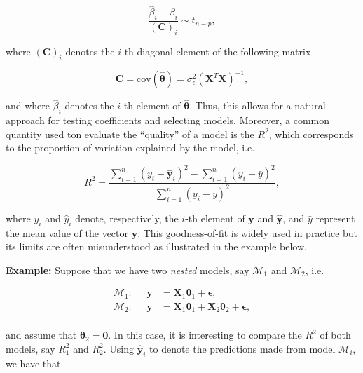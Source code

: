\documentclass[]{book}
\theoremstyle{definition}
\theoremstyle{definition}
\theoremstyle{definition}
\theoremstyle{remark}
\begin{document}
{\begin{equation}
    \frac{\hat{\beta}_i - \beta_i}{\left(\boldsymbol{C}\right)_{i}} \sim t_{n-p},
    \label{eq:beta_t_dist}
\end{equation}

where \(\left(\boldsymbol{C}\right)_{i}\) denotes the \(i\)-th diagonal
element of the following matrix

\begin{equation}
        \boldsymbol{C} = \text{cov} \left(\hat{\boldsymbol{\theta}} \right) = \sigma_{\epsilon}^2 \left(\mathbf{X}^T \mathbf{X}\right)^{-1},
    \label{eq:covbeta}
\end{equation}

and where \(\hat{\beta}_i\) denotes the \(i\)-th element of
\(\hat{\boldsymbol{\theta}}\). Thus, this allows for a natural approach
for testing coefficients and selecting models. Moreover, a common
quantity used ton evaluate the ``quality'' of a model is the \(R^2\),
which corresponds to the proportion of variation explained by the model,
i.e.

\[R^2 = \frac{\sum_{i=1}^n \left(y_i - \hat{\mathbf{y}}_i\right)^2 - \sum_{i=1}^n \left(y_i - \bar{y}\right)^2}{\sum_{i=1}^n \left(y_i - \bar{y}\right)^2},\]

where \(y_i\) and \(\hat{y}_i\) denote, respectively, the \(i\)-th
element of \(\mathbf{y}\) and \(\hat{\mathbf{y}}\), and \(\bar{y}\)
represent the mean value of the vector \(\mathbf{y}\). This
goodness-of-fit is widely used in practice but its limits are often
misunderstood as illustrated in the example below.

\textbf{Example:} Suppose that we have two \emph{nested} models, say
\(\mathcal{M}_1\) and \(\mathcal{M}_2\), i.e.

\[\begin{aligned}
\mathcal{M}_1: \;\;\;\;\; \mathbf{y} &= \mathbf{X}_1 \boldsymbol{\theta}_1 + \boldsymbol{\epsilon},\\
\mathcal{M}_2: \;\;\;\;\; \mathbf{y} &= \mathbf{X}_1 \boldsymbol{\theta}_1 + \mathbf{X}_2 \boldsymbol{\theta}_2 + \boldsymbol{\epsilon},\\
\end{aligned}\]

and assume that \(\boldsymbol{\theta}_2 = \boldsymbol{0}\). In this
case, it is interesting to compare the \(R^2\) of both models, say
\(R_1^2\) and \(R^2_2\). Using \(\hat{\mathbf{y}}_i\) to denote the
predictions made from model \(\mathcal{M}_i\), we have that

}
\end{document}
